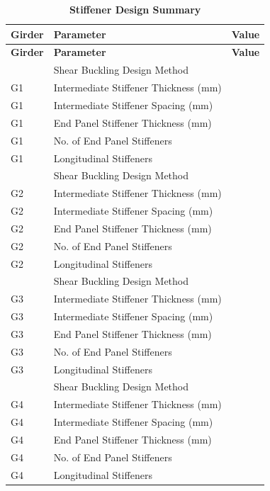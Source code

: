 \documentclass[12pt,a4paper]{report}
\numberwithin{table}{chapter}
\numberwithin{figure}{chapter}
\newcommand{\ReportTableGap}{\vspace{1em}}
\begin{document}
\ReportTableGap
\begin{longtable}{|C{2.5cm}|L{6.5cm}|>{\arraybackslash}p{6.5cm}|}
\caption{\textbf{Stiffener Design Summary}}\\
\hline
\textbf{Girder} & \textbf{Parameter} & \textbf{Value} \\
\hline
\endfirsthead
\hline
\textbf{Girder} & \textbf{Parameter} & \textbf{Value} \\
\hline
\endhead

 & \textnormal{Shear Buckling Design Method} &  \\[6pt]
G1 & \textnormal{Intermediate Stiffener Thickness (mm)} &  \\[6pt]
G1 & \textnormal{Intermediate Stiffener Spacing (mm)} &  \\[6pt]
G1 & \textnormal{End Panel Stiffener Thickness (mm)} &  \\[6pt]
G1 & \textnormal{No. of End Panel Stiffeners} &  \\[6pt]
G1 & \textnormal{Longitudinal Stiffeners} &  \\[6pt]
\hline
{} & \textnormal{Shear Buckling Design Method} &  \\[6pt]
G2 & \textnormal{Intermediate Stiffener Thickness (mm)} &  \\[6pt]
G2 & \textnormal{Intermediate Stiffener Spacing (mm)} &  \\[6pt]
G2 & \textnormal{End Panel Stiffener Thickness (mm)} &  \\[6pt]
G2 & \textnormal{No. of End Panel Stiffeners} &  \\[6pt]
G2 & \textnormal{Longitudinal Stiffeners} &  \\[6pt]
\hline
{} & \textnormal{Shear Buckling Design Method} &  \\[6pt]
G3 & \textnormal{Intermediate Stiffener Thickness (mm)} &  \\[6pt]
G3 & \textnormal{Intermediate Stiffener Spacing (mm)} &  \\[6pt]
G3 & \textnormal{End Panel Stiffener Thickness (mm)} &  \\[6pt]
G3 & \textnormal{No. of End Panel Stiffeners} &  \\[6pt]
G3 & \textnormal{Longitudinal Stiffeners} &  \\[6pt]
\hline
{} & \textnormal{Shear Buckling Design Method} &  \\[6pt]
G4 & \textnormal{Intermediate Stiffener Thickness (mm)} &  \\[6pt]
G4 & \textnormal{Intermediate Stiffener Spacing (mm)} &  \\[6pt]
G4 & \textnormal{End Panel Stiffener Thickness (mm)} &  \\[6pt]
G4 & \textnormal{No. of End Panel Stiffeners} &  \\[6pt]
G4 & \textnormal{Longitudinal Stiffeners} &  \\[6pt]
\hline
\end{longtable}
\end{document}
